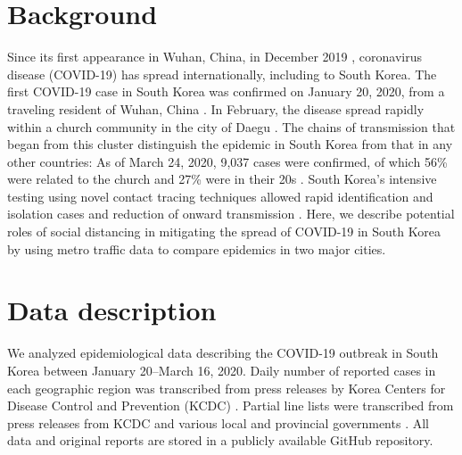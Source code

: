 \documentclass[12pt]{article}
\date{\today}
\begin{document}


\pagebreak

\section{Background}

Since its first appearance in Wuhan, China, in December 2019 \citep{pneumonia}, coronavirus disease (COVID-19) has spread internationally, including to South Korea.
The first COVID-19 case in South Korea was confirmed on January 20, 2020, from a traveling resident of Wuhan, China \citep{kcdc}.
In February, the disease spread rapidly within a church community in the city of Daegu \citep{kcdc}.
The chains of transmission that began from this cluster distinguish the epidemic in South Korea from that in any other countries:
As of March 24, 2020, 9,037 cases were confirmed, of which 56\% were related to the church and 27\% were in their 20s \citep{kcdc}.
South Korea's intensive testing using novel contact tracing techniques allowed rapid identification and isolation cases and reduction of onward transmission \citep{fergusonimpact, tracingkorea, science}.
Here, we describe potential roles of social distancing in mitigating the spread of COVID-19 in South Korea by using metro traffic data to compare epidemics in two major cities.

\section{Data description}

We analyzed epidemiological data describing the COVID-19 outbreak in South Korea between January 20--March 16, 2020.
Daily number of reported cases in each geographic region was transcribed from press releases by Korea Centers for Disease Control and Prevention (KCDC) \cite{kcdc}.
Partial line lists were transcribed from press releases from KCDC and various local and provincial governments \cite{seoul, busan, gwangju, ulsan, gyeonggi, daegu}.
All data and original reports are stored in a publicly available GitHub repository.
\end{document}
